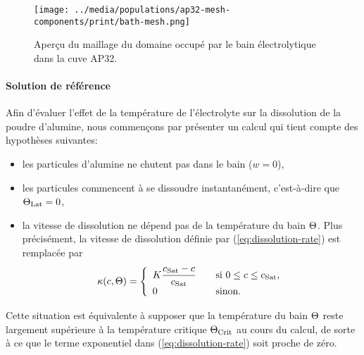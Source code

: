 \begin{figure}
  \begin{center}
    \texttt{[image: ../media/populations/ap32-mesh-components/print/bath-mesh.png]}
    \caption{Aperçu du maillage du domaine occupé par le bain
      électrolytique dans la cuve AP32.}
    \label{fig:bath-mesh}
  \end{center}
\end{figure}

\paragraph{Solution de référence} Afin d'évaluer l'effet de la
température de l'électrolyte sur la dissolution de la poudre
d'alumine, nous commençons par présenter un calcul qui tient compte
des hypothèses suivantes:
\begin{itemize}
\item les particules d'alumine ne chutent pas dans le bain ($w = 0$),
\item les particules commencent à se dissoudre instantanément, c'est-à-dire que $\Theta_\text{Lat} = 0$,
\item la vitesse de dissolution ne dépend pas de la température du
  bain $\Theta$. Plus précisément, la vitesse de dissolution
  définie par (\ref{eq:dissolution-rate}) est remplacée par
\begin{equation}
  \kappa(c, \Theta)= \left\{
  \begin{array}{ll}
    K\displaystyle\frac{c_\text{Sat} - c}{c_\text{Sat}} &\quad \text{si } 0\leq
    c \leq c_\text{Sat},\\
    0& \quad \text{sinon}.
  \end{array}
  \right.
\end{equation}
\end{itemize}
Cette situation est équivalente à supposer que la température du
bain $\Theta$ reste largement supérieure à la température
critique $\Theta_\text{Crit}$ au cours du calcul, de sorte à ce que le terme
exponentiel dans (\ref{eq:dissolution-rate}) soit proche de zéro.

